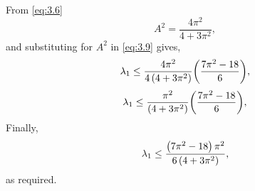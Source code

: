 From \eqref{eq:3.6}
\[
	A^2=\frac{4\pi^2}{4+3\pi^2},
\]
and substituting for $A^2$ in \eqref{eq:3.9} gives,
\[
	\lambda_1 \leq \frac{4\pi^2}{4\left(4+3\pi^2\right)}\bigg(\frac{ 7\pi^2 -18}{6}\bigg),
\]
\[
	\lambda_1 \leq \frac{\pi^2}{\left(4+3\pi^2\right)}\bigg(\frac{ 7\pi^2 -18}{6}\bigg),
\]
Finally,
\[
	\lambda_1 \leq \frac{\left(7\pi^2 - 18\right)\pi^2}{6\left(4+3\pi^2\right)},
\]
as required.
